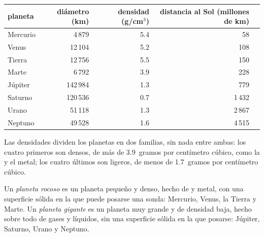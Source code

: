 \begin{center}
\small
\begin{tabular}{lrrrr}
\hline
planeta & diámetro (km) & densidad (g/cm$^3$) & distancia al Sol (millones de km)\\
\hline
Mercurio & 4\,879 & 5.4 & 58\\
Venus & 12\,104 & 5.2 & 108\\
Tierra & 12\,756 & 5.5 & 150\\
Marte & 6\,792 & 3.9 & 228\\
\hline
Júpiter & 142\,984 & 1.3 & 779\\
Saturno & 120\,536 & 0.7 & 1\,432\\
Urano & 51\,118 & 1.3 & 2\,867\\
Neptuno & 49\,528 & 1.6 & 4\,515\\
\hline
\end{tabular}
\end{center}

Las densidades dividen los planetas en dos familias, sin nada entre ambas:
los cuatro primeros son densos, de más de 3.9~gramos por centímetro cúbico,
como la  y el metal; los cuatro últimos son ligeros, de menos de
1.7~gramos por centímetro cúbico.

\begin{definition}\label{def:g6:earth-a-planet:planet-types}
Un \emph{planeta rocoso} es un planeta pequeño y
denso, hecho de  y metal, con una superficie sólida en la que puede
posarse una sonda: Mercurio, Venus, la Tierra y Marte. Un \emph{planeta
gigante} es un planeta muy grande y de densidad
baja, hecho sobre todo de gases y líquidos, sin una superficie sólida en
la que posarse: Júpiter, Saturno, Urano y Neptuno.
\end{definition}

